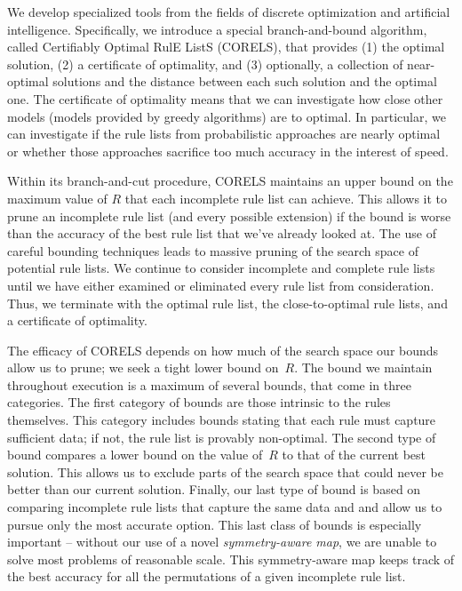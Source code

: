 We develop specialized tools from the fields of discrete optimization and artificial intelligence.
%
Specifically, we introduce a special branch-and-bound algorithm,
called Certifiably Optimal RulE ListS (CORELS), that provides
(1) the optimal solution, (2) a certificate of optimality, and (3) optionally,
a collection of near-optimal solutions and the distance between each such solution and the optimal one.
%
The certificate of optimality means that we can investigate how close other models (\eg models provided by greedy algorithms) are to optimal. In particular, we can investigate if the rule lists from probabilistic approaches are nearly optimal or whether those approaches sacrifice too much accuracy in the interest of speed.

\begin{arxiv}
Within its branch-and-cut procedure, CORELS maintains an upper bound on the maximum value of $R$ that each incomplete rule list can achieve. This allows it to prune an incomplete rule list (and every possible extension) if the bound is worse than the accuracy of the best rule list that we've already looked at. The use of careful bounding techniques leads to massive pruning of the search space of potential rule lists. We continue to consider incomplete and complete rule lists until we have either examined or eliminated every rule list from consideration. Thus, we terminate with the optimal rule list, the close-to-optimal rule lists, and a certificate of optimality.
\end{arxiv}

The efficacy of CORELS depends on how much of the search space our bounds
allow us to prune; we seek a tight lower bound on~$R$.
%
The bound we maintain throughout execution is a maximum of several bounds,
that come in three categories.
%
The first category of bounds are those intrinsic to the rules themselves.
%
This category includes bounds stating that each rule must capture sufficient data;
if not, the rule list is provably non-optimal.
%
The second type of bound compares a lower bound on the value of~$R$
to that of the current best solution.
%
This allows us to exclude parts of the search space that could never be better
than our current solution.
%
Finally, our last type of bound is based on comparing incomplete rule lists that
capture the same data and and allow us to pursue only the most accurate option.
%
This last class of bounds is especially important -- without our use of a novel
\textit{symmetry-aware map}, we are unable to solve most problems of reasonable scale.
%
This symmetry-aware map keeps track of the best accuracy
for all the permutations of a given incomplete rule list.

